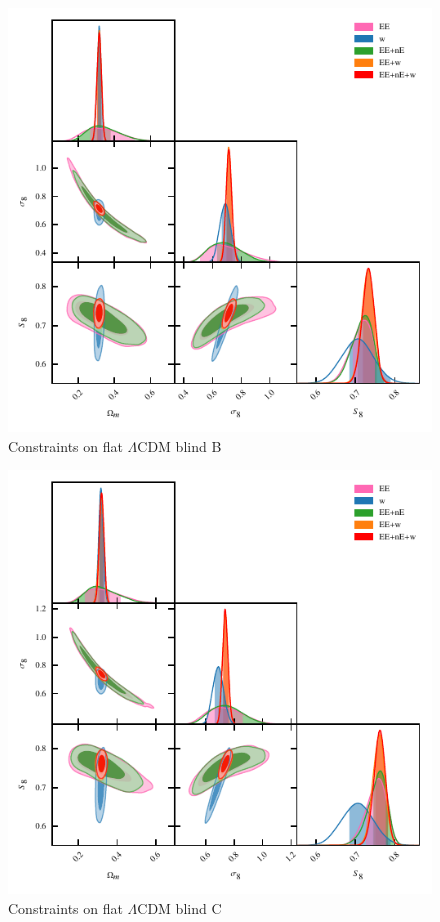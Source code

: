 \begin{figure}
	\begin{center}
		\includegraphics[width=\columnwidth]{Parameter_Plots/omegam_sigma8_s8_blind_B}
		\caption{Constraints on flat $\Lambda$CDM blind B}
		\label{fig:cosmology-params}
	\end{center}
\end{figure}

\begin{figure}
	\begin{center}
		\includegraphics[width=\columnwidth]{Parameter_Plots/omegam_sigma8_s8_blind_C}
		\caption{Constraints on flat $\Lambda$CDM blind C}
		\label{fig:cosmology-params}
	\end{center}
\end{figure}


